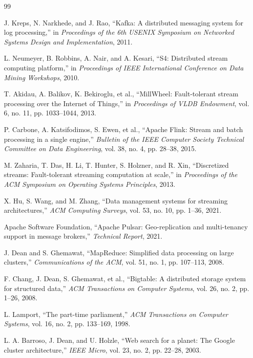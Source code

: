 \documentclass[10pt,twocolumn]{article}
\begin{document}
\begin{thebibliography}{99}

 J. Kreps, N. Narkhede, and J. Rao, ``Kafka: A distributed messaging system for log processing,'' in \textit{Proceedings of the 6th USENIX Symposium on Networked Systems Design and Implementation}, 2011.

 L. Neumeyer, B. Robbins, A. Nair, and A. Kesari, ``S4: Distributed stream computing platform,'' in \textit{Proceedings of IEEE International Conference on Data Mining Workshops}, 2010.

 T. Akidau, A. Balikov, K. Bekiroglu, et al., ``MillWheel: Fault-tolerant stream processing over the Internet of Things,'' in \textit{Proceedings of VLDB Endowment}, vol. 6, no. 11, pp. 1033--1044, 2013.

 P. Carbone, A. Katsifodimos, S. Ewen, et al., ``Apache Flink: Stream and batch processing in a single engine,'' \textit{Bulletin of the IEEE Computer Society Technical Committee on Data Engineering}, vol. 38, no. 4, pp. 28--38, 2015.

 M. Zaharia, T. Das, H. Li, T. Hunter, S. Holzner, and R. Xin, ``Discretized streams: Fault-tolerant streaming computation at scale,'' in \textit{Proceedings of the ACM Symposium on Operating Systems Principles}, 2013.

 X. Hu, S. Wang, and M. Zhang, ``Data management systems for streaming architectures,'' \textit{ACM Computing Surveys}, vol. 53, no. 10, pp. 1--36, 2021.

 Apache Software Foundation, ``Apache Pulsar: Geo-replication and multi-tenancy support in message brokers,'' \textit{Technical Report}, 2021.

 J. Dean and S. Ghemawat, ``MapReduce: Simplified data processing on large clusters,'' \textit{Communications of the ACM}, vol. 51, no. 1, pp. 107--113, 2008.

 F. Chang, J. Dean, S. Ghemawat, et al., ``Bigtable: A distributed storage system for structured data,'' \textit{ACM Transactions on Computer Systems}, vol. 26, no. 2, pp. 1--26, 2008.

 L. Lamport, ``The part-time parliament,'' \textit{ACM Transactions on Computer Systems}, vol. 16, no. 2, pp. 133--169, 1998.

 L. A. Barroso, J. Dean, and U. Holzle, ``Web search for a planet: The Google cluster architecture,'' \textit{IEEE Micro}, vol. 23, no. 2, pp. 22--28, 2003.


\end{thebibliography}
\end{document}
